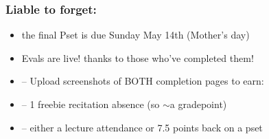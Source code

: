 \begin{frame}
\frametitle{Liable to forget:}

\begin{itemize}[<+->]


\item the final Pset is due Sunday May 14th (Mother's day)

\item Evals are live! thanks to those who've completed them! 

\item[] -- Upload screenshots of BOTH completion pages to earn: %

\item[] -- 1 freebie recitation absence (so $\sim$a gradepoint)

\item[] -- either a lecture attendance or 7.5 points back on a pset



\end{itemize}
\end{frame}

